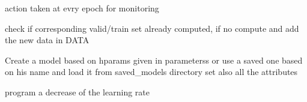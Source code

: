 \documentclass[letterpaper,10pt,english]{sphinxmanual}
\begin{document}
\begin{fulllineitems}

\begin{fulllineitems}
\label{\detokenize{CHF_model_api:CHF_model_api.model.MyModel.init_callbacks}}
\pysigstartsignatures
{}
\pysigstopsignatures
\sphinxAtStartPar
action taken at evry epoch for monitoring

\end{fulllineitems}


\begin{fulllineitems}
\label{\detokenize{CHF_model_api:CHF_model_api.model.MyModel.loadData}}
\pysigstartsignatures
{}
\pysigstopsignatures
\sphinxAtStartPar
check if corresponding valid/train set already computed,
if no compute and add the new data in DATA

\end{fulllineitems}


\begin{fulllineitems}
\label{\detokenize{CHF_model_api:CHF_model_api.model.MyModel.loadMyModel}}
\pysigstartsignatures
{}
\pysigstopsignatures
\sphinxAtStartPar
Create a model based on hparams given in parameterss
or use a saved one based on his name and load it from saved\_models
directory set also all the attributes

\end{fulllineitems}


\begin{fulllineitems}
\label{\detokenize{CHF_model_api:CHF_model_api.model.MyModel.lrScheduler}}
\pysigstartsignatures
{}
\pysigstopsignatures
\sphinxAtStartPar
program a decrease of the learning rate


\end{fulllineitems}
\end{fulllineitems}
\end{document}
